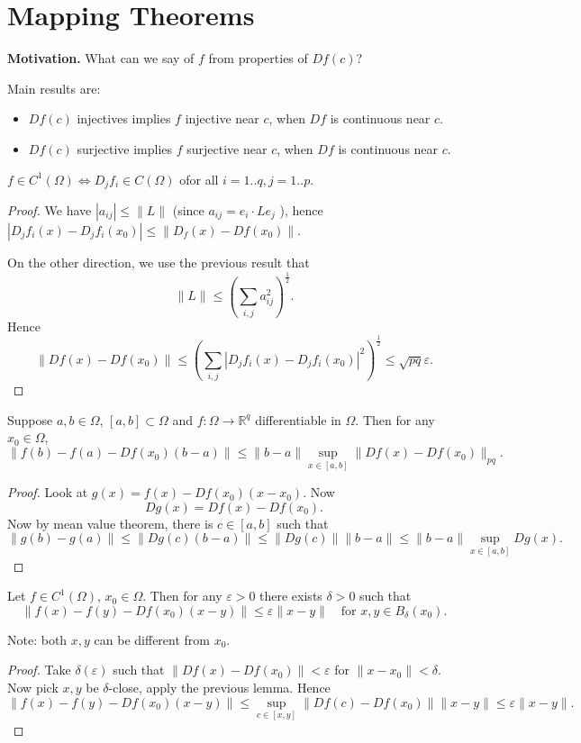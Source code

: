 
\section{Mapping Theorems}

\textbf{Motivation.} What can we say of $f$ from properties of $Df(c)$?

Main results are:
\begin{itemize}
	\item $Df(c)$ injectives implies $f$ injective near $c$, when $Df$ is continuous near $c$.
	\item $Df(c)$ surjective implies $f$ surjective near $c$, when $Df$ is continuous near $c$.
\end{itemize}

\begin{proposition}
	$f \in C^1(\Omega) \iff  D_j f_i \in C(\Omega)$ ofor all $i = 1..q, j=1..p$.
\end{proposition}
\begin{proof}
	We have $|a_{ij}| \le \|L\|$ (since $a_{ij} = e_i \cdot L e_j$ ), hence $|D_j f_i(x) - D_j f_i(x_0)| \le  \|D_f(x) - Df(x_0)\|$.

	On the other direction, we use the previous result that
	\[
		\|L\|\le \left( \sum_{i, j}^{} a_{ij}^2 \right) ^{\frac{1}{2}}
	.\] 
	Hence
	\[
		\|Df(x) - Df(x_0)\|\le \left( \sum_{i, j}^{} \left| D_jf_i(x) - D_jf_i(x_0) \right| ^2 \right) ^{\frac{1}{2}} \le \sqrt{pq}\varepsilon 
	.\] 
\end{proof}

\begin{lemma}
	Suppose $a,b \in \Omega$, $[a,b] \subset \Omega$ and $f: \Omega \to \mathbb{R}^q$ differentiable in $\Omega$.
	Then for any $x_0 \in \Omega$,
	\[
		\|f(b) - f(a) - Df(x_0)(b-a)\|\le \|b-a\|\operatorname{sup}_{x \in \left[ a,b \right] } \|Df(x) - Df(x_0)\|_{pq}
	.\] 
\end{lemma}
\begin{proof}
	Look at $g(x)=f(x) - Df(x_0)(x - x_0)$. Now
	\[
		Dg(x) = Df(x) - Df(x_0)
	.\] 
	Now by mean value theorem, there is $c \in [a,b]$ such that
	\[
		\|g(b) - g(a)\|\le \|Dg(c)(b-a)\|\le \|Dg(c)\|\|b-a\| \le \|b-a\| \operatorname{sup}_{x \in [a,b]} Dg(x)
	.\] 
\end{proof}


\begin{lemma}
	Let $f \in C^1(\Omega)$, $x_0 \in \Omega$. Then for any $\varepsilon>0$ there exists $\delta>0$ such that
	\[
		\|f(x) - f(y) - Df(x_0)(x-y)\|\le \varepsilon\|x-y\| \quad \text{for }x, y \in B_\delta(x_0)
	.\] 
\end{lemma}
Note: both $x,y$ can be different from $x_0$.
\begin{proof}
	Take $\delta(\varepsilon)$ such that $\|Df(x) - Df(x_0)\|<\varepsilon$ for $\|x-x_0\|<\delta$. Now pick $x,y$ be $\delta$-close, apply the previous lemma. Hence
	\[
		\|f(x) - f(y) - Df(x_0)(x-y)\|\le \operatorname{sup} _{c \in [x,y]} \|Df(c) - Df(x_0)\|\|x-y\|\le \varepsilon \|x-y\|
	.\] 
\end{proof}


